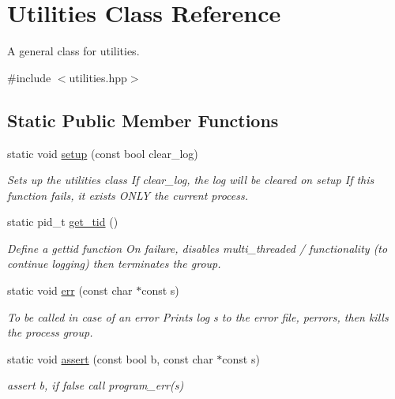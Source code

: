 \hypertarget{class_utilities}{\section{Utilities Class Reference}
\label{class_utilities}
}


A general class for utilities.  




{\ttfamily \#include $<$utilities.\-hpp$>$}

\subsection*{Static Public Member Functions}
\begin{DoxyCompactItemize}
\item 
static void \hyperlink{class_utilities_aa448e199bdc43fe62e9b9b989a7f667b}{setup} (const bool clear\-\_\-log)
\begin{DoxyCompactList}\small\item\em Sets up the utilities class If clear\-\_\-log, the log will be cleared on setup If this function fails, it exists {\itshape O\-N\-L\-Y} the current process. \end{DoxyCompactList}\item 
static pid\-\_\-t \hyperlink{class_utilities_a93f3699cf92128c66efa084ff1399a45}{get\-\_\-tid} ()
\begin{DoxyCompactList}\small\item\em Define a gettid function On failure, disables multi\-\_\-threaded / functionality (to continue logging) then terminates the group. \end{DoxyCompactList}\item 
static void \hyperlink{class_utilities_a5308da50597c93aad2b1ca2ecfbcb723}{err} (const char $\ast$const s)
\begin{DoxyCompactList}\small\item\em To be called in case of an error Prints log s to the error file, perrors, then kills the process group. \end{DoxyCompactList}\item 
static void \hyperlink{class_utilities_a22c85a2970e168ca0b9ad6fd86752792}{assert} (const bool b, const char $\ast$const s)
\begin{DoxyCompactList}\small\item\em assert b, if false call program\-\_\-err(s) \end{DoxyCompactList}\item 

\end{DoxyCompactItemize}

